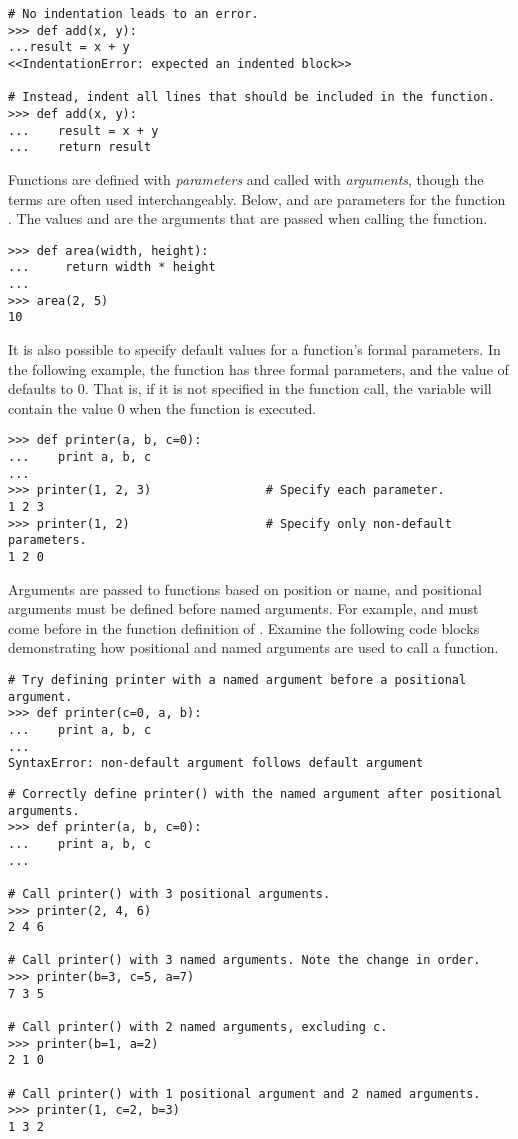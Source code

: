 \begin{lstlisting}
# No indentation leads to an error.
>>> def add(x, y):
...result = x + y
<<IndentationError: expected an indented block>>

# Instead, indent all lines that should be included in the function.
>>> def add(x, y):
...    result = x + y
...    return result
\end{lstlisting}

Functions are defined with \emph{parameters} and called with \emph{arguments}, though the terms are often used interchangeably.
Below,  and  are parameters for the function .
The values  and  are the arguments that are passed when calling the function.

\begin{lstlisting}
>>> def area(width, height):
...     return width * height
...         
>>> area(2, 5)
10
\end{lstlisting}

It is also possible to specify default values for a function's formal parameters.
In the following example, the function  has three formal parameters, and the value of  defaults to 0.
That is, if it is not specified in the function call, the variable  will contain the value 0 when the function is executed.

\begin{lstlisting}
>>> def printer(a, b, c=0):
...    print a, b, c
...
>>> printer(1, 2, 3)                # Specify each parameter.
1 2 3
>>> printer(1, 2)                   # Specify only non-default parameters.
1 2 0
\end{lstlisting} %

Arguments are passed to functions based on position or name, and positional arguments must be defined before named arguments.
For example,  and  must come before  in the function definition of .
Examine the following code blocks demonstrating how positional and named arguments are used to call a function.

\begin{lstlisting}
# Try defining printer with a named argument before a positional argument.
>>> def printer(c=0, a, b):
...    print a, b, c
...
SyntaxError: non-default argument follows default argument
\end{lstlisting}

\begin{lstlisting}
# Correctly define printer() with the named argument after positional arguments.
>>> def printer(a, b, c=0):
...    print a, b, c
...

# Call printer() with 3 positional arguments.
>>> printer(2, 4, 6)
2 4 6

# Call printer() with 3 named arguments. Note the change in order.
>>> printer(b=3, c=5, a=7)
7 3 5

# Call printer() with 2 named arguments, excluding c.
>>> printer(b=1, a=2)
2 1 0

# Call printer() with 1 positional argument and 2 named arguments.
>>> printer(1, c=2, b=3)
1 3 2
\end{lstlisting}

